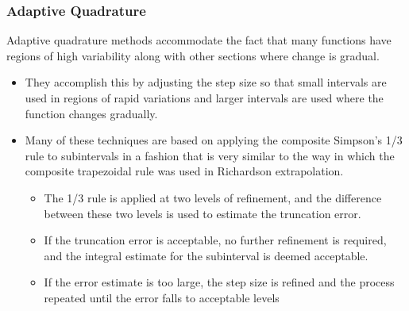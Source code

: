 \documentclass{if-beamer}
\begin{document}
\begin{frame}[t]
	\frametitle{Adaptive Quadrature}
	Adaptive quadrature methods accommodate the fact that many functions have regions of
	high variability along with other sections where change is gradual.
	\begin{itemize}
		\item They accomplish this
		by adjusting the step size so that small intervals are used in regions of rapid variations and
		larger intervals are used where the function changes gradually. \vspace{5pt}
		\item Many of these techniques
		are based on applying the composite Simpson’s 1/3 rule to subintervals in a fashion that
		is very similar to the way in which the composite trapezoidal rule was used in Richardson
		extrapolation. \vspace{5pt}
		\begin{itemize}
			\item The 1/3 rule is applied at two levels of refinement, and the difference
			between these two levels is used to estimate the truncation error. \vspace{3pt}
			\item If the truncation error is
			acceptable, no further refinement is required, and the integral estimate for the subinterval is
			deemed acceptable. \vspace{3pt}
			\item  If the error estimate is too large, the step size is refined and the process
			repeated until the error falls to acceptable levels \vspace{3pt}
		\end{itemize}
	\end{itemize}
\end{frame}
\end{document}
